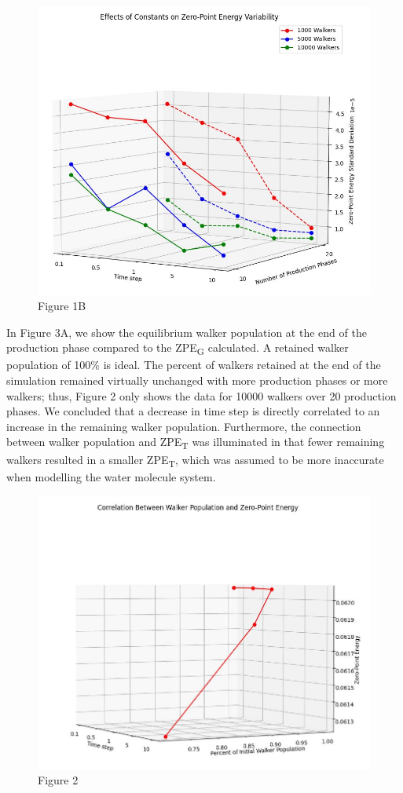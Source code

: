 \documentclass[journal=jacsat,manuscript=article]{achemso}
\begin{document}
\begin{figure}
  \includegraphics[width=\linewidth]{fig_1B.jpg}
  \caption{Figure 1B}
  \label{fig:}
\end{figure}

In Figure 3A, we show the equilibrium walker population at the end of the production phase compared to the ZPE\textsubscript{G} calculated. A retained walker population of 100\% is ideal. The percent of walkers retained at the end of the simulation remained virtually unchanged with more production phases or more walkers; thus, Figure 2 only shows the data for 10000 walkers over 20 production phases. We concluded that a decrease in time step is directly correlated to an increase in the remaining walker population. Furthermore, the connection between walker population and ZPE\textsubscript{T} was illuminated in that fewer remaining walkers resulted in a smaller ZPE\textsubscript{T}, which was assumed to be more inaccurate when modelling the water molecule system. 

\begin{figure}
  \includegraphics[width=\linewidth]{fig_2.jpg}
  \caption{Figure 2}
  \label{fig:}
\end{figure}
\end{document}
